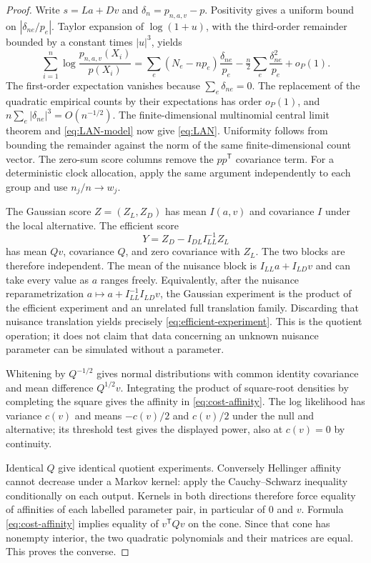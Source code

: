 \begin{proof}
Write $s=La+Dv$ and $\delta_n=p_{n,a,v}-p$. Positivity gives a uniform bound on $|\delta_{ne}/p_e|$. Taylor expansion of $\log(1+u)$, with the third-order remainder bounded by a constant times $|u|^3$, yields
\[
 \sum_{i=1}^n\log\frac{p_{n,a,v}(X_i)}{p(X_i)}
 =\sum_e(N_e-np_e)\frac{\delta_{ne}}{p_e}
 -\tfrac n2\sum_e\frac{\delta_{ne}^2}{p_e}+o_P(1).
\]
The first-order expectation vanishes because $\sum_e\delta_{ne}=0$. The replacement of the quadratic empirical counts by their expectations has order $o_P(1)$, and $n\sum_e|\delta_{ne}|^3=O(n^{-1/2})$. The finite-dimensional multinomial central limit theorem and \eqref{eq:LAN-model} now give \eqref{eq:LAN}. Uniformity follows from bounding the remainder against the norm of the same finite-dimensional count vector. The zero-sum score columns remove the $pp^{\mathsf T}$ covariance term. For a deterministic clock allocation, apply the same argument independently to each group and use $n_j/n\to w_j$.

The Gaussian score $Z=(Z_L,Z_D)$ has mean $I(a,v)$ and covariance $I$ under the local alternative. The efficient score
\[
 Y=Z_D-I_{DL}I_{LL}^{-1}Z_L
\]
has mean $Qv$, covariance $Q$, and zero covariance with $Z_L$. The two blocks are therefore independent. The mean of the nuisance block is $I_{LL}a+I_{LD}v$ and can take every value as $a$ ranges freely. Equivalently, after the nuisance reparametrization $a\mapsto a+I_{LL}^{-1}I_{LD}v$, the Gaussian experiment is the product of the efficient experiment and an unrelated full translation family. Discarding that nuisance translation yields precisely \eqref{eq:efficient-experiment}. This is the quotient operation; it does not claim that data concerning an unknown nuisance parameter can be simulated without a parameter.

Whitening by $Q^{-1/2}$ gives normal distributions with common identity covariance and mean difference $Q^{1/2}v$. Integrating the product of square-root densities by completing the square gives the affinity in \eqref{eq:cost-affinity}. The log likelihood has variance $c(v)$ and means $-c(v)/2$ and $c(v)/2$ under the null and alternative; its threshold test gives the displayed power, also at $c(v)=0$ by continuity.

Identical $Q$ give identical quotient experiments. Conversely Hellinger affinity cannot decrease under a Markov kernel: apply the Cauchy--Schwarz inequality conditionally on each output. Kernels in both directions therefore force equality of affinities of each labelled parameter pair, in particular of $0$ and $v$. Formula \eqref{eq:cost-affinity} implies equality of $v^{\mathsf T}Qv$ on the cone. Since that cone has nonempty interior, the two quadratic polynomials and their matrices are equal. This proves the converse.
\end{proof}

